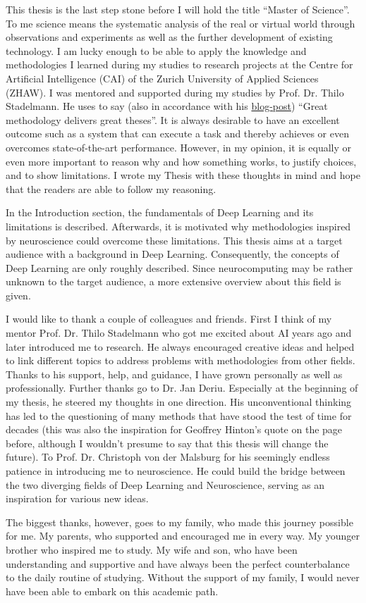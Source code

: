 \small
This thesis is the last step stone before I will hold the title ``Master of Science''.
To me science means the systematic analysis of the real or virtual world through observations and experiments as well as the further development of existing technology. 
I am lucky enough to be able to apply the knowledge and methodologies I learned during my studies to research projects at the Centre for Artificial Intelligence (CAI) of the Zurich University of Applied Sciences (ZHAW).
I was mentored and supported during my studies by Prof. Dr. Thilo Stadelmann.
He uses to say (also in accordance with his \href{https://stdm.github.io/Great-methodology-delivers-great-theses/}{blog-post}) ``Great methodology delivers great theses''.
It is always desirable to have an excellent outcome such as a system that can execute a task and thereby achieves or even overcomes state-of-the-art performance.
However, in my opinion, it is equally or even more important to reason why and how something works, to justify choices, and to show limitations.
I wrote my Thesis with these thoughts in mind and hope that the readers are able to follow my reasoning.

In the Introduction section, the fundamentals of Deep Learning and its limitations is described.
Afterwards, it is motivated why methodologies inspired by neuroscience could overcome these limitations.
This thesis aims at a target audience with a background in Deep Learning.
Consequently, the concepts of Deep Learning are only roughly described.
Since neurocomputing may be rather unknown to the target audience, a more extensive overview about this field is given.

I would like to thank a couple of colleagues and friends.
First I think of my mentor Prof. Dr. Thilo Stadelmann who got me excited about AI years ago and later introduced me to research.
He always encouraged creative ideas and helped to link different topics to address problems with methodologies from other fields.
Thanks to his support, help, and guidance, I have grown personally as well as professionally.
Further thanks go to Dr. Jan Deriu. 
Especially at the beginning of my thesis, he steered my thoughts in one direction.
His unconventional thinking has led to the questioning of many methods that have stood the test of time for decades (this was also the inspiration for Geoffrey Hinton's quote on the page before, although I wouldn't presume to say that this thesis will change the future).
To Prof. Dr. Christoph von der Malsburg for his seemingly endless patience in introducing me to neuroscience.
He could build the bridge between the two diverging fields of Deep Learning and Neuroscience, serving as an inspiration for various new ideas.

The biggest thanks, however, goes to my family, who made this journey possible for me.
My parents, who supported and encouraged me in every way.
My younger brother who inspired me to study.
My wife and son, who have been understanding and supportive and have always been the perfect counterbalance to the daily routine of studying.
Without the support of my family, I would never have been able to embark on this academic path.
\normalsize
